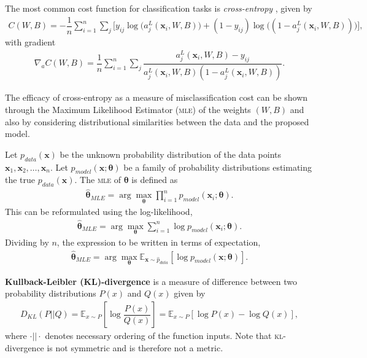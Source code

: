 The most common cost function for classification tasks is \textit{cross-entropy} \citep{Nielson2015}, given by
\begin{align}\label{nnets-cross-entropy-eq}
	C(W,B) = -\dfrac{1}{n}\sum_{i=1}^n\sum_j\big[y_{ij}\log\big(a_j^L(\mathbf{x}_i,W,B)\big) + (1 - y_{ij})\log\big( (1 - a_j^L(\mathbf{x}_i,W,B))\big)\big],
\end{align}
with gradient
\begin{align}
	\nabla_aC(W,B) = \dfrac{1}{n}\sum_{i=1}^n\sum_j\dfrac{a_j^L(\mathbf{x}_i,W,B) - y_{ij}}{a_j^L(\mathbf{x}_i,W,B)(1-a_j^L(\mathbf{x}_i,W,B))}.
\end{align}

The efficacy of cross-entropy as a measure of misclassification cost can be shown through the Maximum Likelihood Estimator (\textsc{mle}) of the weights $(W, B)$ and also by considering distributional similarities between the data and the proposed model.

Let ${p}_{data}(\mathbf{x})$ be the unknown probability distribution of the data points $\mathbf{x}_1, \mathbf{x}_2, \ldots, \mathbf{x}_n$. Let $p_{model}(\mathbf{x}; \mathbf{\theta})$ be a family of probability distributions estimating the true $p_{data}(\mathbf{x})$. The \textsc{mle} of $\mathbf{\theta}$ is defined as
\begin{align}
	\hat{\mathbf{\theta}}_{MLE} = \arg\max_{\mathbf{\theta}}\prod_{i=1}^np_{model}(\mathbf{x}_i;\mathbf{\theta}).
\end{align}
This can be reformulated using the log-likelihood,
\begin{align}
	\hat{\mathbf{\theta}}_{MLE} = \arg\max_{\mathbf{\theta}}\sum_{i=1}^n\log p_{model}(\mathbf{x}_i;\mathbf{\theta}).
\end{align}
Dividing by $n$, the expression to be written in terms of expectation,
\begin{align}\label{nnets-mle-eq}
	\hat{\mathbf{\theta}}_{MLE} = \arg\max_{\mathbf{\theta}}\mathbb{E}_{\mathbf{x}\sim \hat{p}_{data}}\left[\log p_{model}(\mathbf{x}; \mathbf{\theta})\right].
\end{align}

\begin{definition}
	\textbf{Kullback-Leibler (KL)-divergence} is a measure of difference between two probability distributions $P(x)$ and $Q(x)$ given by
	\begin{align}
		D_{KL}(P||Q) = \mathbb{E}_{x\sim P}\left[\log\dfrac{P(x)}{Q(x)}\right] = \mathbb{E}_{x\sim P}[\log P(x) - \log Q(x)],
	\end{align}
	where $\cdot||\cdot$ denotes necessary ordering of the function inputs. Note that \textsc{kl}-divergence is not symmetric and is therefore not a metric.	
\end{definition}

